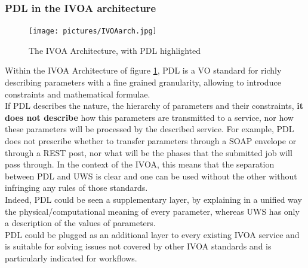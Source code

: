 \documentclass[a4paper,11pt] {ivoa}
\begin{document}
\subsubsection{PDL in the IVOA architecture}
\begin{figure}[htbp]
\begin{center}
\texttt{[image: pictures/IVOAarch.jpg]} 
\caption{The IVOA Architecture, with PDL highlighted}
\label{Pic-arch}
\end{center}
\end{figure}
Within the IVOA Architecture of figure \ref{Pic-arch}, PDL is a VO standard for richly describing parameters with a fine grained granularity, allowing to introduce constraints and mathematical formulae.\\
If PDL describes the nature, the hierarchy of parameters and their constraints, {\bf it  does not describe} how this parameters are transmitted to a service, nor how these parameters will be processed by the described service. For example, PDL does not prescribe whether to transfer parameters through a SOAP envelope or through a REST post, nor what will be the  phases that the submitted job will pass through. In the context of the IVOA, this means that the separation between PDL and UWS is clear and one can be used without the other without infringing any rules of those  standards.\\
Indeed, PDL could be seen a supplementary layer, by explaining in a unified way the physical/computational meaning of every parameter, whereas UWS has only a description of the values of parameters. \\
PDL could be plugged as an additional layer to every existing IVOA service and is suitable for solving issues not covered by other IVOA standards and is particularly indicated for workflows.
\end{document}
